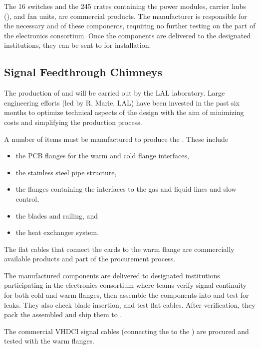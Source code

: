 The  \num{16}  switches and the \num{245}  crates containing the power modules, carrier hubs (), and fan units, are commercial products. The manufacturer is responsible for the necessary  and   of these components, requiring no further testing on the part of the \dual electronics consortium. Once the components are delivered to the designated institutions, they can be sent to  for installation. 


\subsection{Signal Feedthrough Chimneys}
\label{ssec:dp-tpcelec-prod-sft}

The production of  and  will be carried out by the LAL laboratory. Large engineering efforts (led by R. Marie, LAL) have been invested in the past six months to optimize technical aspects of the design with the aim of minimizing costs and simplifying the production process.

A number of items must be manufactured to produce the . These include 
\begin{itemize}
\item the PCB flanges for the warm and cold \fdth flange interfaces, 
\item the stainless steel pipe structure, 
\item the flanges containing the interfaces to the gas and liquid lines and slow control, 
\item the blades and railing, and 
\item the heat exchanger system. 
\end{itemize}
The flat cables that connect the  cards to the warm flange are commercially available products and part of the  procurement process. 

The manufactured components are delivered to designated institutions participating in the \dual electronics consortium where teams verify signal continuity for both cold and warm flanges, then assemble the components into  and test for leaks. They also check blade insertion, and test flat cables. After verification, they pack the assembled  and ship them to . 

The commercial VHDCI signal cables (connecting the  to the ) are procured and tested with the  warm flanges.


